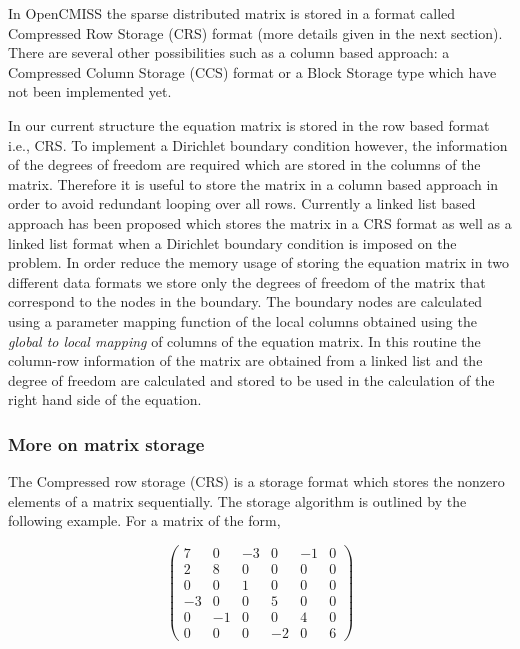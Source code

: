  In OpenCMISS the sparse distributed matrix is stored in a format called Compressed Row Storage (CRS) format 
(more details given in the next section). There are several other possibilities such as a column based approach: a Compressed Column Storage (CCS) format or a Block Storage type which have not been implemented yet. 

In our current structure the equation matrix is stored in the row based format i.e., CRS. 
To implement a Dirichlet boundary condition however, the information of the degrees of freedom are required which are stored in the columns of the matrix. 
Therefore it is useful to store the matrix in a column based approach in order to avoid redundant looping over all rows.
Currently a linked list based approach has been proposed which stores the matrix in a CRS format as well as a linked list format 
when a Dirichlet boundary condition is imposed on the problem. In order reduce the memory usage of storing the equation matrix
 in two different data formats we store only the degrees of freedom of the matrix that correspond to the nodes in the boundary. 
The boundary nodes are calculated using a parameter mapping function of the local columns obtained using the 
\emph{global to local mapping} of columns of the equation matrix. In this routine the column-row information of the matrix are obtained 
from a linked list and the degree of freedom are calculated and stored to be used in the calculation of the right 
hand side of the equation.



\subsubsection{More on matrix storage}


The Compressed row storage (CRS) is a storage format which stores the nonzero elements of a matrix sequentially. 
The storage algorithm is outlined by the following example. For a matrix of the form,

\[ \left( \begin{array}{cccccc}
 7 & 0 &-3 & 0 &-1 & 0 \\
 2 & 8 & 0 & 0 & 0 & 0 \\
 0 & 0 & 1 & 0 & 0 & 0 \\
-3 & 0 & 0 & 5 & 0 & 0 \\
 0 &-1 & 0 & 0 & 4 & 0 \\
 0 & 0 & 0 &-2 & 0 & 6 \end{array} \right)\] 




